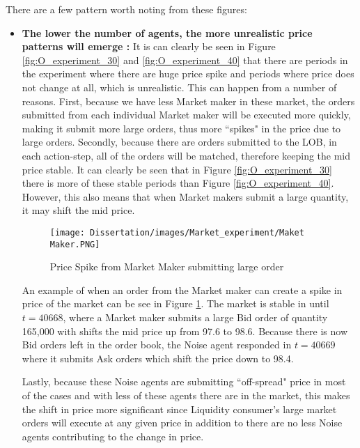 There are a few pattern worth noting from these figures: 
\begin{itemize}
  \item \textbf{The lower the number of agents, the more unrealistic price patterns will emerge : } It is can clearly be seen in Figure \ref{fig:O_experiment_30} and \ref{fig:O_experiment_40} that there are periods in the experiment where there are huge price spike and periods where price does not change at all, which is unrealistic. This can happen from a number of reasons. First, because we have less Market maker in these market, the orders submitted from each individual Market maker will be executed more quickly, making it submit more large orders, thus more ``spikes" in the price due to large orders. Secondly, because there are  orders submitted to the LOB, in each action-step, all of the orders will be matched, therefore keeping the mid price stable. It can clearly be seen that in Figure \ref{fig:O_experiment_30} there is more of these stable periods than Figure \ref{fig:O_experiment_40}. However, this also means that when Market makers submit a large quantity, it may shift the mid price. 
  
    \begin{figure}[h]
    \texttt{[image: Dissertation/images/Market\_experiment/Maket Maker.PNG]}
    \caption{Price Spike from Market Maker submitting large order }  
    \label{fig:MM_large}
    \end{figure} 
    \FloatBarrier
  An example of when an order from the Market maker can create a spike in price of the market can be see in Figure \ref{fig:MM_large}. The market is stable in until $t=40668$, where a Market maker submits a large Bid order of quantity 165,000 with shifts the mid price up from 97.6 to 98.6. Because there is now Bid orders left in the order book, the Noise agent responded in $t=40669$ where it submits Ask orders which shift the price down to 98.4. 
  
  \newline Lastly, because these Noise agents are submitting ``off-spread" price in most of the cases and with less of these agents there are in the market, this makes the shift in price more significant since Liquidity consumer's large market orders will execute at any given price in addition to there are no less Noise agents contributing to the change in price. 
  

\end{itemize}
